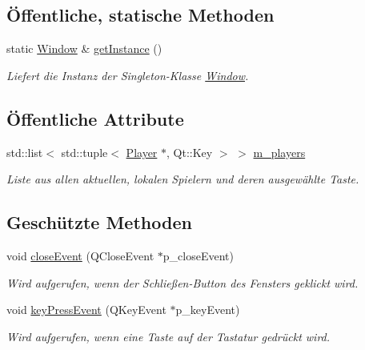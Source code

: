 \subsection*{Öffentliche, statische Methoden}
\begin{DoxyCompactItemize}
\item 
static \hyperlink{class_window}{Window} \& \hyperlink{class_window_a27532de1433b896e6586c3a9e045349d}{get\+Instance} ()
\begin{DoxyCompactList}\small\item\em Liefert die Instanz der Singleton-\/\+Klasse \hyperlink{class_window}{Window}. \end{DoxyCompactList}\end{DoxyCompactItemize}
\subsection*{Öffentliche Attribute}
\begin{DoxyCompactItemize}
\item 
std\+::list$<$ std\+::tuple$<$ \hyperlink{class_player}{Player} $\ast$, Qt\+::\+Key $>$ $>$ \hyperlink{class_window_af408d7d1516a7352c3076e71b8fad7d9}{m\+\_\+players}
\begin{DoxyCompactList}\small\item\em Liste aus allen aktuellen, lokalen Spielern und deren ausgewählte Taste. \end{DoxyCompactList}\end{DoxyCompactItemize}
\subsection*{Geschützte Methoden}
\begin{DoxyCompactItemize}
\item 
void \hyperlink{class_window_abbf36419d16aa9effd72df4fd8a742fe}{close\+Event} (Q\+Close\+Event $\ast$p\+\_\+close\+Event)
\begin{DoxyCompactList}\small\item\em Wird aufgerufen, wenn der Schließen-\/\+Button des Fensters geklickt wird. \end{DoxyCompactList}\item 
void \hyperlink{class_window_a580e4141cd01cb4d6d203cfe5c56352b}{key\+Press\+Event} (Q\+Key\+Event $\ast$p\+\_\+key\+Event)
\begin{DoxyCompactList}\small\item\em Wird aufgerufen, wenn eine Taste auf der Tastatur gedrückt wird. \end{DoxyCompactList}\end{DoxyCompactItemize}


